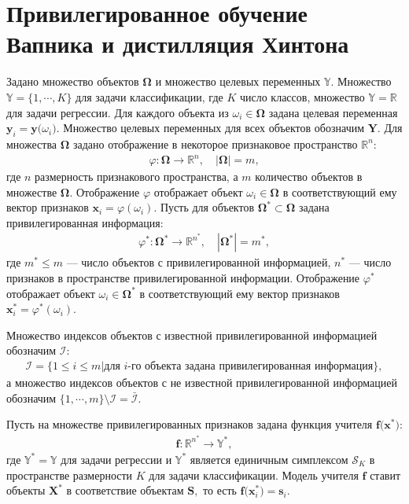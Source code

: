\section{Привилегированное обучение Вапника и дистилляция Хинтона}

Задано множество объектов $\bm{\Omega}$ и множество целевых переменных $\mathbb{Y}$. Множество $\mathbb{Y}=\{1,\cdots,K\}$ для задачи классификации, где $K$ число классов, множество $\mathbb{Y}=\mathbb{R}$ для задачи регрессии.
Для каждого объекта из $\omega_i \in \bm{\Omega}$ задана целевая переменная $\mathbf{y}_i = \mathbf{y}\bigr(\omega_i\bigr)$. Множество целевых переменных для всех объектов обозначим $\mathbf{Y}$.
Для множества $\bm{\Omega}$ задано отображение в некоторое признаковое пространство $\mathbb{R}^{n}$:
\[
\label{eq:st:phi}
\begin{aligned}
\varphi:\bm{\Omega} \to \mathbb{R}^{n}, \quad \left|\bm{\Omega}\right| = m,
\end{aligned}
\]
где $n$ размерность признакового пространства, а $m$ количество объектов в множестве $\bm{\Omega}$. Отображение $\varphi$ отображает объект $\omega_i \in \bm{\Omega}$ в соответствующий ему вектор признаков $\mathbf{x}_i = \varphi(\omega_i)$.
Пусть для объектов $\bm{\Omega}^* \subset \bm{\Omega}$ задана привилегированная информация:
\[
\label{eq:st:phi*}
\begin{aligned}
\varphi^*:\bm{\Omega}^* \to \mathbb{R}^{n^*}, \quad \left|\bm{\Omega}^*\right| = m^*,
\end{aligned}
\]
где $m^* \leq m$ --- число объектов с привилегированной информацией, $n^*$ --- число признаков в пространстве привилегированной информации. Отображение $\varphi^*$ отображает объект $\omega_i \in \bm{\Omega^*}$ в соответствующий ему вектор признаков $\mathbf{x}^*_i = \varphi^*(\omega_i)$.

Множество индексов объектов с известной привилегированной информацией обозначим $\mathcal{I}$:
\[
\label{eq:st:3}
\begin{aligned}
\mathcal{I} = \{1 \leq i \leq m | \text{для $i$-го объекта задана привилегированная информация}\},
\end{aligned}
\]
а множество индексов объектов с не известной привилегированной информацией обозначим $\{1, \cdots, m\}\setminus \mathcal{I} = \bar{\mathcal{I}}$.

Пусть на множестве привилегированных признаков задана функция учителя $\mathbf{f}\bigr(\mathbf{x}^*\bigr)$:
\[
\label{eq:st:4}
\begin{aligned}
\mathbf{f}:\mathbb{R}^{n^*} \to \mathbb{Y}^*,
\end{aligned}
\]
где $\mathbb{Y}^*=\mathbb{Y}$ для задачи регрессии и $\mathbb{Y}^*$ является единичным симплексом $\mathcal{S}_K$ в пространстве размерности $K$ для задачи классификации. Модель учителя $\mathbf{f}$ ставит объекты $\mathbf{X}^*$ в соответствие объектам $\mathbf{S},$ то есть  $\mathbf{f}\bigr(\mathbf{x}^*_i\bigr)=\mathbf{s}_i$.

